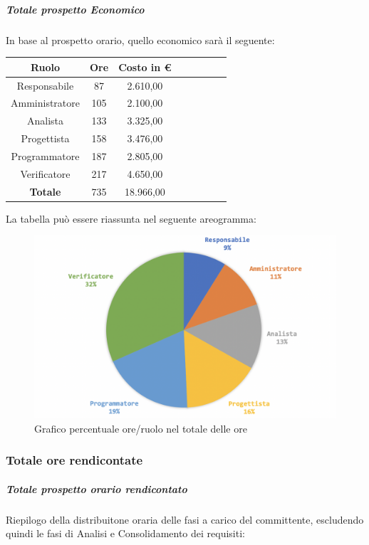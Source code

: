			\subparagraph{Totale prospetto Economico}
			In base al prospetto orario, quello economico sarà il seguente: 
			
			\begin{longtable}{|c|c|c|c|c|c|c|c}
				\hline
				\rowcolor{lighter-grayer}
				\textbf{Ruolo} & \textbf{Ore} & \textbf{Costo in € } \\
				\hline
				\endfirsthead
				
				\hline
				Responsabile 	    & 87 & 2.610,00\\
				\hline 
				\hline
				Amministratore	  & 105 & 2.100,00\\
				\hline
				\hline
				Analista 				& 133 & 3.325,00\\
				\hline
				\hline
				Progettista 		  & 158 & 3.476,00\\
				\hline
				\hline
				Programmatore 	 & 187 & 2.805,00\\
				\hline
				\hline
				Verificatore 		  & 217 & 4.650,00\\
				\hline
				\textbf{Totale} 	& 735 & 18.966,00\\
				\hline
			\end{longtable}
			\pagebreak
			
			La tabella può essere riassunta nel seguente areogramma:
			\begin{figure}[H]
				\centering
				\includegraphics[width=0.8\linewidth]{./images/totOre2.png}
				\caption{Grafico percentuale ore/ruolo nel totale delle ore}
				\label{fig:grafico costi ruolo fase totale ore}
			\end{figure}
		
			\subsubsection{Totale ore rendicontate}
				\subparagraph{Totale prospetto orario rendicontato}
				Riepilogo della distribuitone oraria delle fasi a carico del committente, escludendo quindi le fasi di Analisi e Consolidamento dei requisiti:
				
